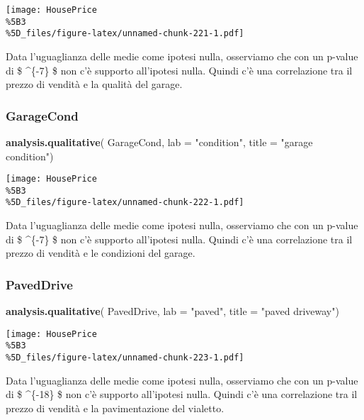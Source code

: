 \documentclass[
]{article}
\newenvironment{Shaded}{\begin{snugshade}}{\end{snugshade}}
\newcommand{\AttributeTok}[1]{\textcolor[rgb]{0.13,0.29,0.53}{#1}}
\newcommand{\FunctionTok}[1]{\textcolor[rgb]{0.13,0.29,0.53}{\textbf{#1}}}
\newcommand{\NormalTok}[1]{#1}
\newcommand{\StringTok}[1]{\textcolor[rgb]{0.31,0.60,0.02}{#1}}
\begin{document}
\texttt{[image: HousePrice\\\%5B3\\\%5D\_files/figure-latex/unnamed-chunk-221-1.pdf]}

Data l'uguaglianza delle medie come ipotesi nulla, osserviamo che con un
p-value di \$ \^{}\{-7\} \$ non c'è supporto all'ipotesi
nulla. Quindi c'è una correlazione tra il prezzo di vendità e la qualità
del garage.

\subsubsection{GarageCond}\label{garagecond-1}

\begin{Shaded}
\begin{Highlighting}[]
\FunctionTok{analysis.qualitative}\NormalTok{(}
\NormalTok{    GarageCond,}
    \AttributeTok{lab =} \StringTok{"condition"}\NormalTok{,}
    \AttributeTok{title =} \StringTok{"garage condition"}\NormalTok{)}
\end{Highlighting}
\end{Shaded}

\texttt{[image: HousePrice\\\%5B3\\\%5D\_files/figure-latex/unnamed-chunk-222-1.pdf]}

Data l'uguaglianza delle medie come ipotesi nulla, osserviamo che con un
p-value di \$ \^{}\{-7\} \$ non c'è supporto all'ipotesi
nulla. Quindi c'è una correlazione tra il prezzo di vendità e le
condizioni del garage.

\subsubsection{PavedDrive}\label{paveddrive-1}

\begin{Shaded}
\begin{Highlighting}[]
\FunctionTok{analysis.qualitative}\NormalTok{(}
\NormalTok{    PavedDrive,}
    \AttributeTok{lab =} \StringTok{"paved"}\NormalTok{,}
    \AttributeTok{title =} \StringTok{"paved driveway"}\NormalTok{)}
\end{Highlighting}
\end{Shaded}

\texttt{[image: HousePrice\\\%5B3\\\%5D\_files/figure-latex/unnamed-chunk-223-1.pdf]}

Data l'uguaglianza delle medie come ipotesi nulla, osserviamo che con un
p-value di \$ \^{}\{-18\} \$ non c'è supporto all'ipotesi
nulla. Quindi c'è una correlazione tra il prezzo di vendità e la
pavimentazione del vialetto.
\end{document}
